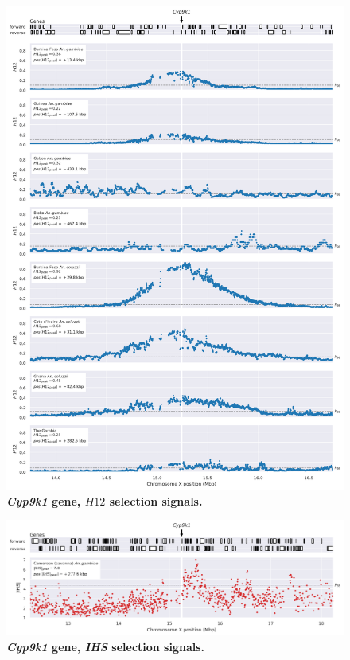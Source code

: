\documentclass[a4paper,11pt,abstracton,hidelinks]{scrartcl}
\begin{document}
\begin{figure}[t!]
	\begin{center}
		\includegraphics*[width=1\linewidth,center]{artwork/locus_cyp9k1_h12_pdist.png}
	\end{center}
	\caption[\textit{Cyp9k1} gene, $H12$ selection signals]{
	\textbf{\textit{Cyp9k1} gene, $H12$ selection signals.}
	} 
	\label{fig:locus_cyp9k1_h12}
\end{figure}


\clearpage


\begin{figure}[t!]
	\begin{center}
		\includegraphics*[width=1\linewidth,center]{artwork/locus_cyp9k1_ihs_pdist.png}
	\end{center}
	\caption[\textit{Cyp9k1} gene, \textit{IHS} selection signals]{
	\textbf{\textit{Cyp9k1} gene, \textit{IHS} selection signals.}
	} 
	\label{fig:locus_cyp9k1_ihs}
\end{figure}
\end{document}
